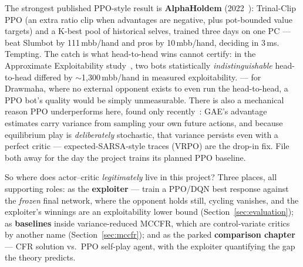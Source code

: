 The strongest published PPO-style result is \textbf{AlphaHoldem} (2022~\cite{alphaholdem}): Trinal-Clip PPO (an extra ratio clip when advantages are negative, plus pot-bounded value targets) and a K-best pool of historical selves, trained three days on one PC --- beat Slumbot by 111\,mbb/hand and pros by 10\,mbb/hand, deciding in 3\,ms. Tempting. The catch is what head-to-head wins cannot certify: in the Approximate Exploitability study~\cite{timbers2022}, two bots statistically \emph{indistinguishable} head-to-head differed by $\sim$1{,}300\,mbb/hand in measured exploitability.  --- for Drawmaha, where no external opponent exists to even run the head-to-head, a PPO bot's quality would be simply unmeasurable. There is also a mechanical reason PPO underperforms here, found only recently~\cite{vrpo}: GAE's advantage estimates carry variance from sampling your own future actions, and because equilibrium play is \emph{deliberately} stochastic, that variance persists even with a perfect critic --- expected-SARSA-style traces (VRPO) are the drop-in fix. File both away for the day the project trains its planned PPO baseline.

So where does actor--critic \emph{legitimately} live in this project? Three places, all supporting roles: as the \textbf{exploiter} --- train a PPO/DQN best response against the \emph{frozen} final network, where the opponent holds still, cycling vanishes, and the exploiter's winnings are an exploitability lower bound (Section~\ref{sec:evaluation}); as \textbf{baselines} inside variance-reduced MCCFR, which are control-variate critics by another name (Section~\ref{sec:mccfr}); and as the parked \textbf{comparison chapter} --- CFR solution vs.\ PPO self-play agent, with the exploiter quantifying the gap the theory predicts.
